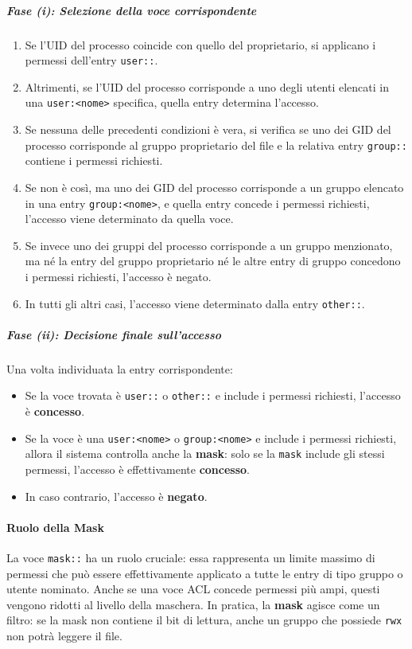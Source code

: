 \subparagraph{Fase (i): Selezione della voce corrispondente}
\begin{enumerate}
  \item Se l'UID del processo coincide con quello del proprietario, si applicano i permessi dell’entry \texttt{user::}.
  \item Altrimenti, se l’UID del processo corrisponde a uno degli utenti elencati in una \texttt{user:<nome>} specifica, quella entry determina l’accesso.
  \item Se nessuna delle precedenti condizioni è vera, si verifica se uno dei GID del processo corrisponde al gruppo proprietario del file e la relativa entry \texttt{group::} contiene i permessi richiesti.
  \item Se non è così, ma uno dei GID del processo corrisponde a un gruppo elencato in una entry \texttt{group:<nome>}, e quella entry concede i permessi richiesti, l’accesso viene determinato da quella voce.
  \item Se invece uno dei gruppi del processo corrisponde a un gruppo menzionato, ma né la entry del gruppo proprietario né le altre entry di gruppo concedono i permessi richiesti, l’accesso è negato.
  \item In tutti gli altri casi, l’accesso viene determinato dalla entry \texttt{other::}.
\end{enumerate}

\subparagraph{Fase (ii): Decisione finale sull’accesso}
Una volta individuata la entry corrispondente:
\begin{itemize}
  \item Se la voce trovata è \texttt{user::} o \texttt{other::} e include i permessi richiesti, l’accesso è \textbf{concesso}.
  \item Se la voce è una \texttt{user:<nome>} o \texttt{group:<nome>} e include i permessi richiesti, allora il sistema controlla anche la \textbf{mask}:
        solo se la \texttt{mask} include gli stessi permessi, l’accesso è effettivamente \textbf{concesso}.
  \item In caso contrario, l’accesso è \textbf{negato}.
\end{itemize}

\paragraph{Ruolo della Mask}
La voce \texttt{mask::} ha un ruolo cruciale: essa rappresenta un limite massimo di permessi che può essere effettivamente applicato a tutte le entry di tipo gruppo o utente nominato.
Anche se una voce ACL concede permessi più ampi, questi vengono ridotti al livello della maschera.
In pratica, la \textbf{mask} agisce come un filtro: se la mask non contiene il bit di lettura, anche un gruppo che possiede \texttt{rwx} non potrà leggere il file.


